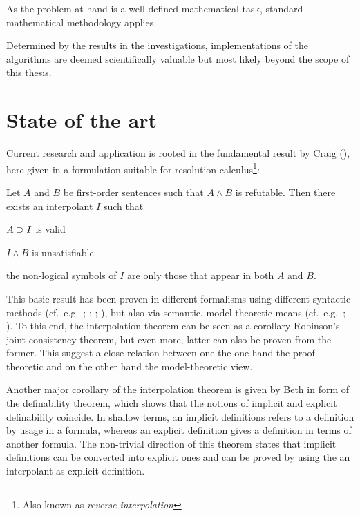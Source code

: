 \documentclass[,%
			paper=a4,%
			DIV11, %
			liststotoc,
			bibtotoc,
			draft=false,%
			numbers=noendperiod
			]{scrartcl}
\begin{document}
As the problem at hand is a well-defined mathematical task, standard mathematical methodology applies.

Determined by the results in the investigations, implementations of the algorithms are deemed scientifically valuable but most likely beyond the scope of this thesis.


\section{State of the art}

Current research and application is rooted in the fundamental result by Craig (\cite{craig57linear}), here given in a formulation suitable for resolution calculus\footnote{Also known as \emph{reverse interpolation}}:

\begin{samepage}
\begin{thm}[Interpolation]
	Let $A$ and $B$ be first-order sentences such that $A \land B$ is refutable. 
	Then there exists an interpolant $I$ such that \nopagebreak[4]
	\begin{compactenum}
		\item $ A \supset I$ is valid 
		\item $I \land B$ is unsatisfiable
		\item the non-logical symbols of $I$ are only those that appear in both $A$ and $B$. \qedhere
	\end{compactenum}
\end{thm}
\end{samepage}

This basic result has been proven in different formalisms using different syntactic methods (cf.~e.g.~\cite{craig57linear}; \cite{takeuti1987proof}; \cite{krajivcek1997interpolation}; \cite{Pudlak97}), but also via semantic, model theoretic means (cf.~e.g.~\cite[section 5.2]{shoenfield1967mathematical}; \cite[theorem~2.2.20]{chang1990model}).
To this end, the interpolation theorem can be seen as a corollary Robinson's joint consistency theorem, but even more, latter can also be proven from the former. 
This suggest a close relation between one the one hand the proof-theoretic and on the other hand the model-theoretic view.

Another major corollary of the interpolation theorem is given by Beth in form of the definability theorem, which shows that the notions of implicit and explicit definability coincide.
In shallow terms, an implicit definitions refers to a definition by usage in a formula, whereas an explicit definition gives a definition in terms of another formula.
The non-trivial direction of this theorem states that implicit definitions can be converted into explicit ones and can be proved by using the an interpolant as explicit definition.
\end{document}
